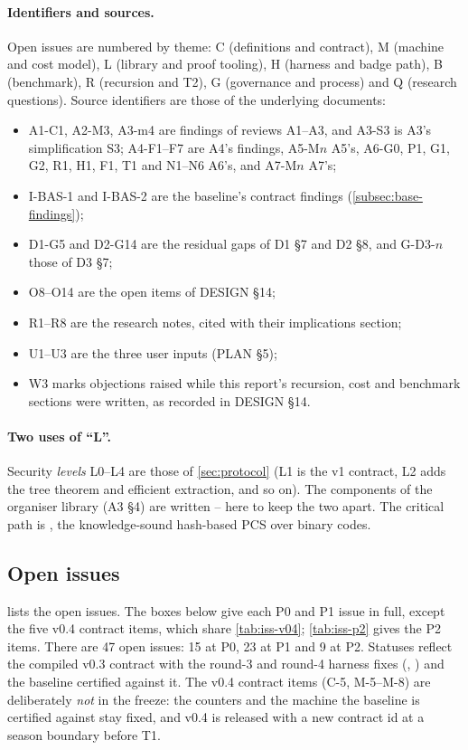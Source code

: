 \paragraph{Identifiers and sources.} Open issues are numbered by theme: C (definitions and
contract), M (machine and cost model), L (library and proof tooling), H (harness and badge path),
B (benchmark), R (recursion and T2), G (governance and process) and Q (research questions). Source
identifiers are those of the underlying documents:
\begin{itemize}[nosep]
\item A1-C1, A2-M3, A3-m4 are findings of reviews A1--A3, and A3-S3 is A3's simplification S3;
  A4-F1--F7 are A4's findings, A5-M$n$ A5's, A6-G0, P1, G1, G2, R1, H1, F1, T1 and N1--N6 A6's,
  and A7-M$n$ A7's;
\item I-BAS-1 and I-BAS-2 are the baseline's contract findings (\cref{subsec:base-findings});
\item D1-G5 and D2-G14 are the residual gaps of D1 §7 and D2 §8, and G-D3-$n$ those of D3 §7;
\item O8--O14 are the open items of DESIGN §14;
\item R1--R8 are the research notes, cited with their implications section;
\item U1--U3 are the three user inputs (PLAN §5);
\item W3 marks objections raised while this report's recursion, cost and benchmark sections were
  written, as recorded in DESIGN §14.
\end{itemize}

\paragraph{Two uses of \enquote{L}.} Security \emph{levels} L0--L4 are those of \cref{sec:protocol}
(L1 is the v1 contract, L2 adds the tree theorem and efficient extraction, and so on). The
components of the organiser library (A3 §4) are written -- here to keep the two
apart. The critical path is , the knowledge-sound hash-based PCS over binary codes.

\subsection{Open issues}\label{subsec:iss-open}

 lists the open issues. The boxes below give each P0 and P1 issue in full,
except the five v0.4 contract items, which share \cref{tab:iss-v04}; \cref{tab:iss-p2} gives the P2
items. There are 47 open issues: 15 at P0, 23 at P1 and 9 at P2. Statuses reflect the compiled v0.3
contract with the round-3 and round-4 harness fixes (, ) and
the baseline certified against it. The v0.4 contract items (C-5, M-5--M-8) are deliberately \emph{not}
in the freeze: the counters and the machine the baseline is certified against
stay fixed, and v0.4 is released with a new contract id at a season boundary before T1.

